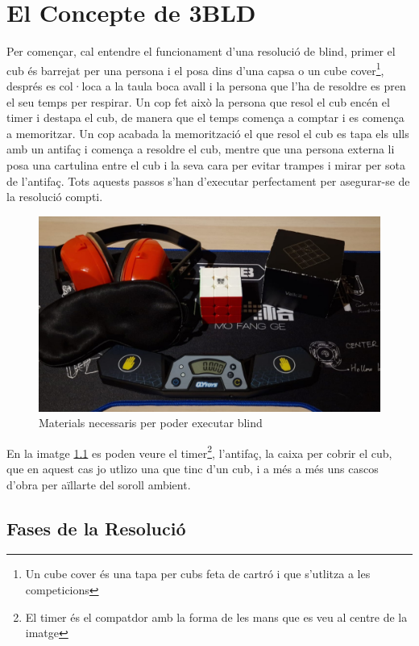 \chapter{El Concepte de 3BLD}

Per començar, cal entendre el funcionament d'una resolució de blind, primer el cub és barrejat per una persona i el posa dins d'una capsa o un cube cover\footnote{Un cube cover és una tapa per cubs feta de cartró i que s'utlitza a les competicions}, després es col·loca a la taula boca avall i la persona que l'ha de resoldre es pren el seu temps per respirar. 
Un cop fet això la persona que resol el cub encén el timer i destapa el cub, de manera que el temps comença a comptar i es comença a memoritzar. Un cop acabada la memorització el que resol el cub es tapa els ulls amb un antifaç i comença a resoldre el cub, mentre que una persona externa li posa una cartulina entre el cub i la seva cara per evitar trampes i mirar per sota de l'antifaç.
Tots aquests passos s'han d'executar perfectament per asegurar-se de la resolució compti.

\begin{figure}[ht]
    \centering
    \includegraphics[width=12cm]{img/figures/materials-bld.jpg}
\caption{Materials necessaris per poder executar blind}
    \label{fig:materials-bld}
\end{figure}

En la imatge \ref{fig:materials-bld} es poden veure el timer\footnote{El timer és el compatdor amb la forma de les mans que es veu al centre de la imatge}, l'antifaç, la caixa per cobrir el cub, que en aquest cas jo utlizo una que tinc d'un cub, i a més a més uns cascos d'obra per aïllarte del soroll ambient.

\vspace{0.5cm}
\section{Fases de la Resolució}

